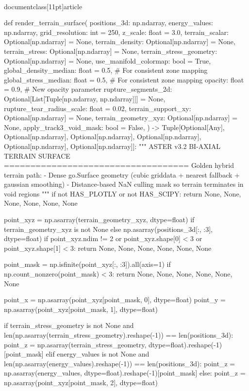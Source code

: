 \\documentclass[11pt]{article}
\begin{document}
\begin{CodeBlock}
def render_terrain_surface(
    positions_3d: np.ndarray,
    energy_values: np.ndarray,
    grid_resolution: int = 250,
    z_scale: float = 3.0,
    terrain_scalar: Optional[np.ndarray] = None,
    terrain_density: Optional[np.ndarray] = None,
    terrain_stress: Optional[np.ndarray] = None,
    terrain_stress_geometry: Optional[np.ndarray] = None,
    use_manifold_colormap: bool = True,
    global_density_median: float = 0.5, # For consistent zone mapping
    global_stress_median: float = 0.5,  # For consistent zone mapping
    opacity: float = 0.9,               # New opacity parameter
    rupture_segments_2d: Optional[List[Tuple[np.ndarray, np.ndarray]]] = None,
    rupture_tear_radius_scale: float = 0.02,
    terrain_support_xy: Optional[np.ndarray] = None,
    terrain_geometry_xyz: Optional[np.ndarray] = None,
    apply_track3_void_mask: bool = False,
) -> Tuple[Optional[Any], Optional[np.ndarray], Optional[np.ndarray], Optional[np.ndarray], Optional[np.ndarray], Optional[np.ndarray]]:
    """
    ASTER v3.2 BI-AXIAL TERRAIN SURFACE
    ===================================
    Golden hybrid terrain path:
    - Dense go.Surface geometry (cubic griddata + nearest fallback + gaussian smoothing)
    - Distance-based NaN culling mask so terrain terminates in void regions
    """
    if not HAS_PLOTLY or not HAS_SCIPY:
        return None, None, None, None, None, None

    point_xyz = np.asarray(terrain_geometry_xyz, dtype=float) if terrain_geometry_xyz is not None else np.asarray(positions_3d[:, :3], dtype=float)
    if point_xyz.ndim != 2 or point_xyz.shape[0] < 3 or point_xyz.shape[1] < 3:
        return None, None, None, None, None, None

    point_mask = np.isfinite(point_xyz[:, :3]).all(axis=1)
    if np.count_nonzero(point_mask) < 3:
        return None, None, None, None, None, None

    point_x = np.asarray(point_xyz[point_mask, 0], dtype=float)
    point_y = np.asarray(point_xyz[point_mask, 1], dtype=float)

    if terrain_stress_geometry is not None and len(np.asarray(terrain_stress_geometry).reshape(-1)) == len(positions_3d):
        point_z = np.asarray(terrain_stress_geometry, dtype=float).reshape(-1)[point_mask]
    elif energy_values is not None and len(np.asarray(energy_values).reshape(-1)) == len(positions_3d):
        point_z = np.asarray(energy_values, dtype=float).reshape(-1)[point_mask]
    else:
        point_z = np.asarray(point_xyz[point_mask, 2], dtype=float)


\end{CodeBlock}
\end{document}
